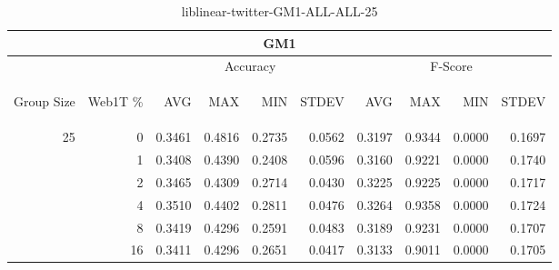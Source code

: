 \begin{center}
\begin{table}[htbp]
\begin{tabular}{ | r | r | r | r | r | r | r | r | r | r |}
\hline
\multicolumn{10}{|c|}{GM1}\\
\hline
 & & \multicolumn{4}{|c|}{Accuracy} & \multicolumn{4}{|c|}{F-Score}\\ \cline{3-10}
\begin{sideways}Group Size\end{sideways} & \begin{sideways}Web1T \%\end{sideways} & \begin{sideways}AVG\end{sideways} & \begin{sideways}MAX\end{sideways} & \begin{sideways}MIN\end{sideways} & \begin{sideways}STDEV\end{sideways} & \begin{sideways}AVG\end{sideways} & \begin{sideways}MAX\end{sideways} & \begin{sideways}MIN\end{sideways} & \begin{sideways}STDEV\end{sideways}\\
\hline
\multirow{5}{*}{25}
 & 0 & 0.3461 & 0.4816 & 0.2735 & 0.0562 & 0.3197 & 0.9344 & 0.0000 & 0.1697\\ \cline{2-10}
 & 1 & 0.3408 & 0.4390 & 0.2408 & 0.0596 & 0.3160 & 0.9221 & 0.0000 & 0.1740\\ \cline{2-10}
 & 2 & 0.3465 & 0.4309 & 0.2714 & 0.0430 & 0.3225 & 0.9225 & 0.0000 & 0.1717\\ \cline{2-10}
 & 4 & 0.3510 & 0.4402 & 0.2811 & 0.0476 & 0.3264 & 0.9358 & 0.0000 & 0.1724\\ \cline{2-10}
 & 8 & 0.3419 & 0.4296 & 0.2591 & 0.0483 & 0.3189 & 0.9231 & 0.0000 & 0.1707\\ \cline{2-10}
 & 16 & 0.3411 & 0.4296 & 0.2651 & 0.0417 & 0.3133 & 0.9011 & 0.0000 & 0.1705\\ \cline{2-10}
\hline
\end{tabular}
\caption{liblinear-twitter-GM1-ALL-ALL-25}
\label{table:liblinear-twitter-GM1-ALL-ALL-25}
\end{table}
\end{center}

